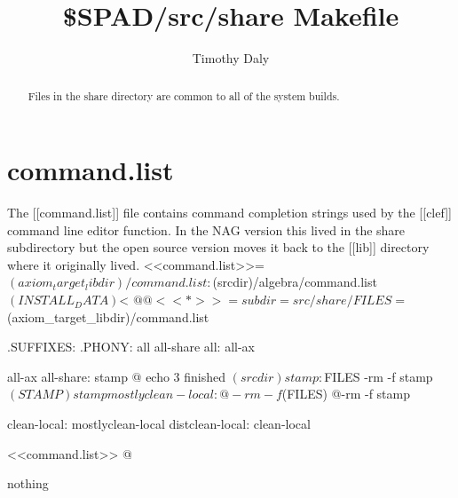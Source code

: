 \documentclass{article}
\begin{document}
\title{\$SPAD/src/share Makefile}
\author{Timothy Daly}
\maketitle
\begin{abstract}
Files in the share directory are common to all of the system builds.
\end{abstract}
\eject
\tableofcontents
\eject
\section{command.list}
The [[command.list]] file contains command completion strings used by
the [[clef]] command line editor function. In the NAG version this
lived in the share subdirectory but the open source version moves it
back to the [[lib]] directory where it originally lived.
<<command.list>>=
$(axiom_target_libdir)/command.list: $(srcdir)/algebra/command.list
	$(INSTALL_DATA) $< $@
@

<<*>>=
subdir = src/share/

FILES=$(axiom_target_libdir)/command.list

.SUFFIXES:
.PHONY: all all-share
all: all-ax

all-ax all-share: stamp
	@ echo 3 finished $(srcdir)

stamp: ${FILES}
	-rm -f stamp
	$(STAMP) stamp

mostlyclean-local:
	@-rm -f $(FILES)
	@-rm -f stamp

clean-local: mostlyclean-local
distclean-local: clean-local

<<command.list>>
@
\eject
\begin{thebibliography}{99}
 nothing
\end{thebibliography}
\end{document}
